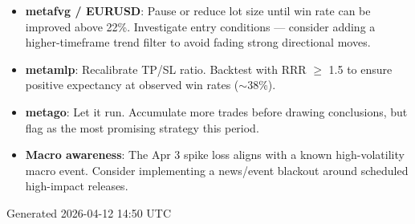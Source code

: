 \documentclass[11pt,a4paper]{article}
\begin{document}
\begin{itemize}
  \item \textbf{metafvg / EURUSD}: Pause or reduce lot size until win rate can be improved above 22\%. Investigate entry conditions — consider adding a higher-timeframe trend filter to avoid fading strong directional moves.
  \item \textbf{metamlp}: Recalibrate TP/SL ratio. Backtest with RRR $\geq$ 1.5 to ensure positive expectancy at observed win rates ($\sim$38\%).
  \item \textbf{metago}: Let it run. Accumulate more trades before drawing conclusions, but flag as the most promising strategy this period.
  \item \textbf{Macro awareness}: The Apr 3 spike loss aligns with a known high-volatility macro event. Consider implementing a news/event blackout around scheduled high-impact releases.
\end{itemize}

\vspace{16pt}
\begin{center}
  \color{muted}\small Generated 2026-04-12 14:50 UTC
\end{center}
\end{document}
